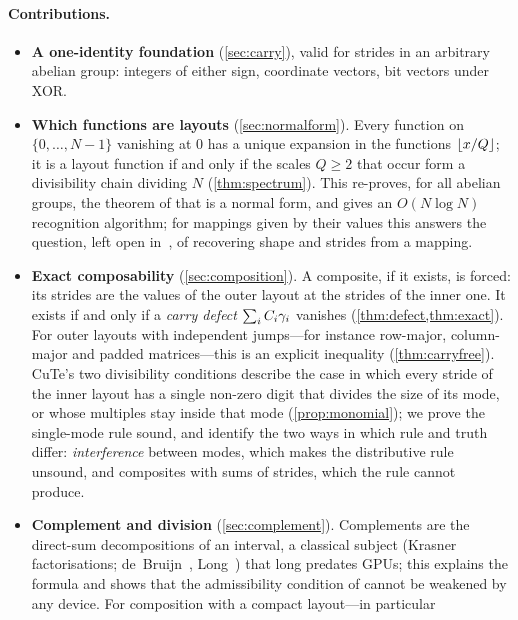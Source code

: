 \paragraph{Contributions.}
\begin{itemize}[leftmargin=1.4em,itemsep=2pt]
\item \textbf{A one-identity foundation} (\cref{sec:carry}), valid for strides in an arbitrary
 abelian group: integers of either sign, coordinate vectors, bit vectors under XOR.
\item \textbf{Which functions are layouts} (\cref{sec:normalform}). Every function on
 $\{0,\dots,N-1\}$ vanishing at $0$ has a unique expansion in the functions $\left\lfloor x/Q \right\rfloor$; it is a
 layout function if and only if the scales $Q\ge2$ that occur form a divisibility chain dividing
 $N$ (\cref{thm:spectrum}). This re-proves, for all abelian groups, the theorem of
 \cite{carlisle2026} that  is a normal form, and gives an $O(N\log N)$
 recognition algorithm; for mappings given by their values this answers the question,
 left open in~\cite[\S3.7]{bhaskaracharya2025}, of recovering shape and strides from a mapping.
\item \textbf{Exact composability} (\cref{sec:composition}). A composite, if it exists, is
 forced: its strides are the values of the outer layout at the strides of the inner one. It exists
 if and only if a \emph{carry defect} $\sum_i C_i\gamma_i$ vanishes (\cref{thm:defect,thm:exact}).
 For outer layouts with independent jumps---for instance row-major, column-major and padded
 matrices---this is an explicit inequality (\cref{thm:carryfree}). CuTe's two divisibility
 conditions describe the case in which every stride of the inner layout has a single non-zero
 digit that divides the size of its mode, or whose multiples stay inside that mode
 (\cref{prop:monomial}); we prove the single-mode rule sound, and identify the two ways in
 which rule and truth differ: \emph{interference} between modes, which makes the distributive
 rule unsound, and composites with sums of strides, which the rule cannot produce.
\item \textbf{Complement and division} (\cref{sec:complement}). Complements are the direct-sum
 decompositions of an interval, a classical subject (Krasner factorisations;
 de~Bruijn~\cite{debruijn1956}, Long~\cite{long1967}) that long predates GPUs; this explains the formula and shows that the admissibility
 condition of \cite{shah2024,carlisle2026} cannot be weakened by any device. For composition with a compact layout---in particular

\end{itemize}
